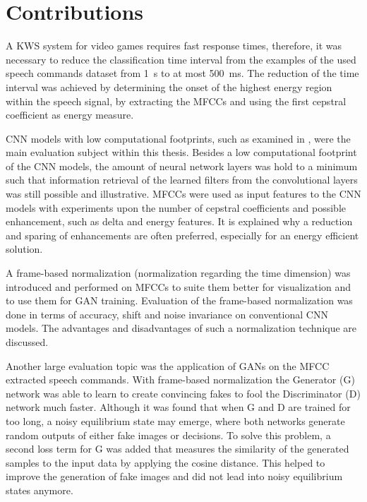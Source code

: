 
\section{Contributions}
A KWS system for video games requires fast response times, therefore, it was necessary to reduce the classification time interval from the examples of the used speech commands dataset \cite{Warden2018} from \SI{1}{\second} to at most \SI{500}{\milli\second}.
The reduction of the time interval was achieved by determining the onset of the highest energy region within the speech signal, by extracting the MFCCs and using the first cepstral coefficient as energy measure.

CNN models with low computational footprints, such as examined in \cite{Sainath2015}, were the main evaluation subject within this thesis.
Besides a low computational footprint of the CNN models, the amount of neural network layers was hold to a minimum such that information retrieval of the learned filters from the convolutional layers was still possible and illustrative.
MFCCs were used as input features to the CNN models with experiments upon the number of cepstral coefficients and possible enhancement, such as delta and energy features.
It is explained why a reduction and sparing of enhancements are often preferred, especially for an energy efficient solution.

A frame-based normalization (normalization regarding the time dimension) was introduced and performed on MFCCs to suite them better for visualization and to use them for GAN training.
Evaluation of the frame-based normalization was done in terms of accuracy, shift and noise invariance on conventional CNN models.
The advantages and disadvantages of such a normalization technique are discussed.

Another large evaluation topic was the application of GANs on the MFCC extracted speech commands. 
With frame-based normalization the Generator (G) network was able to learn to create convincing fakes to fool the Discriminator (D) network much faster.
Although it was found that when G and D are trained for too long, a noisy equilibrium state may emerge, where both networks generate random outputs of either fake images or decisions.
To solve this problem, a second loss term for G was added that measures the similarity of the generated samples to the input data by applying the cosine distance.
This helped to improve the generation of fake images and did not lead into noisy equilibrium states anymore.

